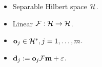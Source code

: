 \documentclass{beamer}
\begin{document}
\begin{frame}
  \begin{columns}
    \begin{column}{0.5\textwidth}
      
      \begin{itemize}
      \item<3-> Separable Hilbert space $\mathcal{H}$.
      \item<4-> Linear \(\mathcal{F}: \mathcal{H} \to \mathcal{H}\).
      \item<5-> \(\mathbf{o}_j \in \mathcal{H}^*, j=1,\dots,m \).
      \item<6-> \(\mathbf{d}_j := \mathbf{o}_j \mathcal{F} \mathbf{m} + \varepsilon\).%
      \end{itemize}
  
      \begin{figure}
        \centering
      \end{figure}
    \end{column}

    \begin{column}{0.5\textwidth}


\end{column}
\end{columns}
\end{frame}
\end{document}
